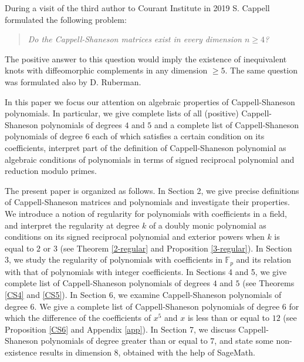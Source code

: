 \documentclass{amsart}
\theoremstyle{plain}
\theoremstyle{definition}
\theoremstyle{remark}
\newcommand{\cb}{}
\begin{document}
{\cb
During a visit of the third author to Courant Institute in 2019
S. Cappell formulated the following problem:

\begin{quote}
{\it
Do the Cappell-Shaneson matrices exist in every dimension $n\geq 4$?
}
\end{quote}

\noindent
The positive answer to this question would imply the existence of
inequivalent knots with diffeomorphic complements in any dimension $\geq 5$.
The same question was formulated also by D. Ruberman.
}



In this paper we focus our attention on algebraic properties of Cappell-Shaneson polynomials. 
In particular, we give complete lists of all (positive) Cappell-Shaneson polynomials of degrees $4$ and $5$ 
and a complete list of Cappell-Shaneson polynomials of degree $6$ each of which satisfies a 
certain condition on its coefficients, 
interpret part of the definition of Cappell-Shaneson polynomial as algebraic conditions of polynomials 
in terms of signed reciprocal polynomial and reduction modulo primes.

The present paper is organized as follows. 
In Section 2, we give precise definitions of Cappell-Shaneson matrices and polynomials 
and investigate
{\cb
their  properties}.
We introduce a notion of regularity for polynomials with coefficients in a field, 
and interpret the regularity at degree $k$ of a doubly monic polynomial as conditions {\cb on }
its signed reciprocal polynomial and exterior powers when $k$ is equal to $2$ or $3$ 
(see Theorem \ref{2-regular} and Proposition \ref{3-regular}). 
In Section 3, we study the regularity of polynomials with coefficients in $\mathbb{F}_p$ 
and its relation with that of polynomials with integer coefficients. 
In Sections 4 and 5, we give complete list of Cappell-Shaneson polynomials of degrees $4$ and $5$ 
(see Theorems \ref{CS4} and \ref{CS5}). 
In Section 6, we examine Cappell-Shaneson polynomials of degree $6$. 
We give a complete list of Cappell-Shaneson polynomials of degree $6$ 
for which the difference of the coefficients of $x^5$ and $x$ is less than or equal to $12$ 
(see Proposition \ref{CS6} and Appendix \ref{app}). 
In Section 7, we discuss Cappell-Shaneson polynomials of degree greater than or equal to $7$,
{\cb
and state some non-existence results in dimension 8, obtained with the help of SageMath.}
\end{document}
